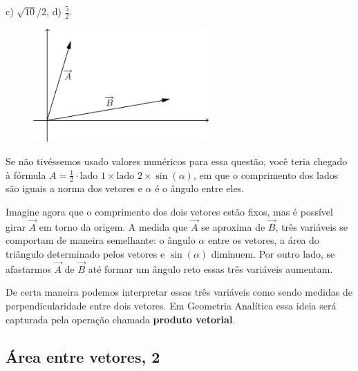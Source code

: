 \documentclass[main.tex]{subfiles}
\begin{document}
\begin{gabarito}
	\begin{gabaritoQuestao}
		c) $\sqrt{10}/2$, d) $\frac{5}{2}$.
	\end{gabaritoQuestao}
\end{gabarito}

\begin{figure}[h]
\centering
\includegraphics[width=0.6\textwidth]{./img/c4q8.png}
\end{figure}

Se não tivéssemos usado valores numéricos para essa questão, você teria chegado à fórmula $A=\frac{1}{2} \cdot \text{lado 1} \times \text{lado 2} \times \sin(\alpha)$, em que o comprimento dos lados são iguais a norma dos vetores e $\alpha$ é o ângulo entre eles.

Imagine agora que o comprimento dos dois vetores estão fixos, mas é possível girar $\overrightarrow{A}$ em torno da origem. A medida que $\overrightarrow{A}$ se aproxima de $\overrightarrow{B}$, três variáveis se comportam de maneira semelhante: o ângulo $\alpha$ entre os vetores, a área do triângulo determinado pelos vetores e $\sin(\alpha)$ diminuem. Por outro lado, se afastarmos $\overrightarrow{A}$ de $\overrightarrow{B}$ até formar um ângulo reto essas três variáveis aumentam.

De certa maneira podemos interpretar essas três variáveis como sendo medidas de perpendicularidade entre dois vetores. Em Geometria Analítica essa ideia será capturada pela operação chamada \textbf{produto vetorial}.

\subsection*{Área entre vetores, 2}
\end{document}
